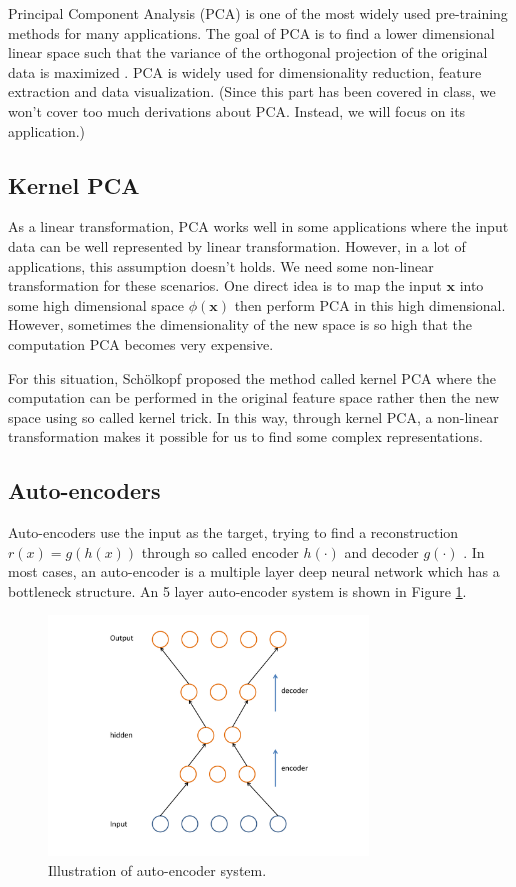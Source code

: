 \documentclass{article}
\begin{document}
Principal Component Analysis (PCA) is one of the most widely used pre-training methods for many applications. The goal of PCA is to find a lower dimensional linear space such that the variance of the orthogonal projection of the original data is maximized \cite{bishop2007pattern}. PCA is widely used for dimensionality reduction, feature extraction and data visualization. (Since this part has been covered in class, we won't cover too much derivations about PCA. Instead, we will focus on its application.)

\subsection{Kernel PCA}

As a linear transformation, PCA works well in some applications where the input data can be well represented by linear transformation. However, in a lot of applications, this assumption doesn't holds. We need some non-linear transformation for these scenarios. One direct idea is to map the input $\pmb{x}$ into some high dimensional space $\phi(\pmb{x})$ then perform PCA in this high dimensional. However, sometimes the dimensionality of the new space is so high that the computation PCA becomes very expensive. 

For this situation, Sch\"{o}lkopf \cite{scholkopf1998nonlinear, friedman2001elements} proposed the method called kernel PCA where the computation can be performed in the original feature space rather then the new space using so called kernel trick. In this way, through kernel PCA, a non-linear transformation makes it possible for us to find some complex representations. 

\subsection{Auto-encoders}

Auto-encoders use the input as the target, trying to find a reconstruction $r(x) = g(h(x))$ through so called encoder $h(\cdot)$ and decoder $g(\cdot)$ \cite{bengio2012deep}. In most cases, an auto-encoder is a multiple layer deep neural network which has a bottleneck structure. An 5 layer auto-encoder system is shown in Figure \ref{fig:autoencoder}.

\begin{figure}[htb]
\centering
\includegraphics[width=8.5cm]{./figures/autoencoder.pdf}
\caption{Illustration of auto-encoder system.}
\label{fig:autoencoder}
\end{figure}
\end{document}

